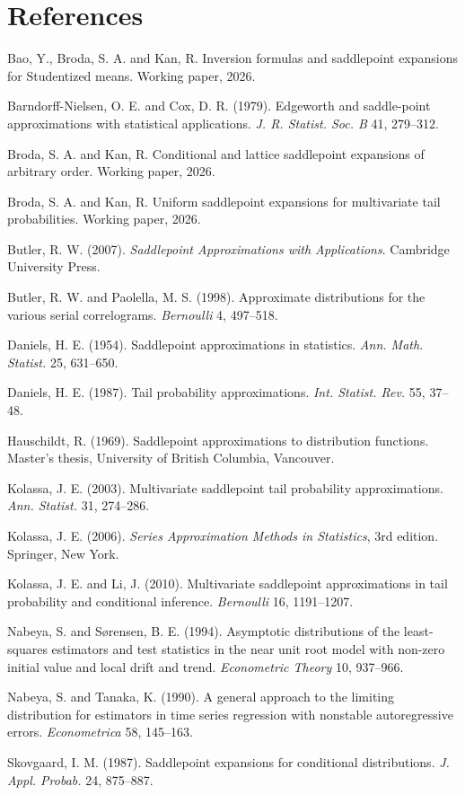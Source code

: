 \documentclass[11pt]{article}
\begin{document}
\section*{References}
\begin{description}\setlength{\itemsep}{2pt}
\item Bao, Y., Broda, S. A. and Kan, R. Inversion formulas and saddlepoint expansions for
Studentized means. Working paper, 2026.
\item Barndorff-Nielsen, O. E. and Cox, D. R. (1979). Edgeworth and saddle-point approximations with
statistical applications. \emph{J. R. Statist. Soc. B} 41, 279--312.
\item Broda, S. A. and Kan, R. Conditional and lattice saddlepoint expansions of arbitrary order.
Working paper, 2026.
\item Broda, S. A. and Kan, R. Uniform saddlepoint expansions for multivariate tail probabilities.
Working paper, 2026.
\item Butler, R. W. (2007). \emph{Saddlepoint Approximations with Applications}. Cambridge
University Press.
\item Butler, R. W. and Paolella, M. S. (1998). Approximate distributions for the various serial
correlograms. \emph{Bernoulli} 4, 497--518.
\item Daniels, H. E. (1954). Saddlepoint approximations in statistics. \emph{Ann. Math. Statist.} 25,
631--650.
\item Daniels, H. E. (1987). Tail probability approximations. \emph{Int. Statist. Rev.} 55, 37--48.
\item Hauschildt, R. (1969). Saddlepoint approximations to distribution functions. Master's thesis,
University of British Columbia, Vancouver.
\item Kolassa, J. E. (2003). Multivariate saddlepoint tail probability approximations. \emph{Ann.
Statist.} 31, 274--286.
\item Kolassa, J. E. (2006). \emph{Series Approximation Methods in Statistics}, 3rd edition. Springer,
New York.
\item Kolassa, J. E. and Li, J. (2010). Multivariate saddlepoint approximations in tail probability and
conditional inference. \emph{Bernoulli} 16, 1191--1207.
\item Nabeya, S. and S{\o}rensen, B. E. (1994). Asymptotic distributions of the least-squares
estimators and test statistics in the near unit root model with non-zero initial value and local
drift and trend. \emph{Econometric Theory} 10, 937--966.
\item Nabeya, S. and Tanaka, K. (1990). A general approach to the limiting distribution for estimators
in time series regression with nonstable autoregressive errors. \emph{Econometrica} 58, 145--163.
\item Skovgaard, I. M. (1987). Saddlepoint expansions for conditional distributions. \emph{J. Appl.
Probab.} 24, 875--887.
\end{description}
\end{document}
